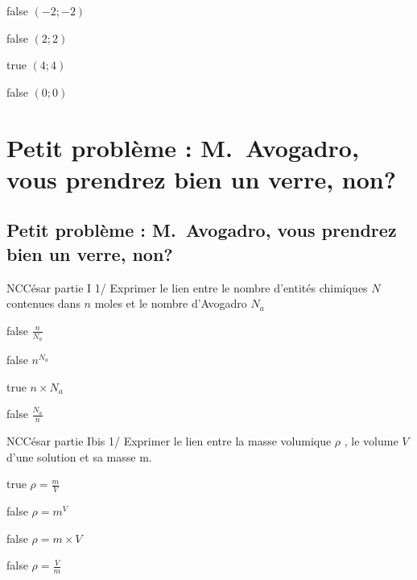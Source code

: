 \documentclass[11pt]{article}
\begin{document}
            \begin{reponses}
            	\item[false] $(-2;-2)$
            	\item[false] $(2;2)$
                \item[true] $(4;4)$
                \item[false] $(0;0)$
            \end{reponses}

       

    \section{Petit problème : M.~Avogadro, vous prendrez bien un verre, non?}
    
      \subsection{Petit problème : M.~Avogadro, vous prendrez bien un verre, non?}
      
            \begin{question}{NC}{César partie I }{1}{/}
				 Exprimer le lien entre le nombre d'entités chimiques $N$ contenues dans $n$ moles et le nombre d'Avogadro $N_a$

            \end{question}

            \begin{reponses}
            	\item[false] $\frac{n}{N_a} $
            	\item[false] $n^{N_a}$
                \item[true]  $n\times N_a $
                \item[false] $\frac{N_a}{n} $
            \end{reponses}
			
			\begin{question}{NC}{César partie Ibis }{1}{/}
				 Exprimer le lien entre la masse volumique $\rho$ , le volume $V$ d'une solution et sa masse m.

            \end{question}

            \begin{reponses}
            	\item[true] $\rho = \frac{m}{V} $
            	\item[false] $\rho= m^{V}$
                \item[false]  $\rho = m\times V $
                \item[false] $\rho = \frac{V}{m} $
            \end{reponses}
           
\end{document}
